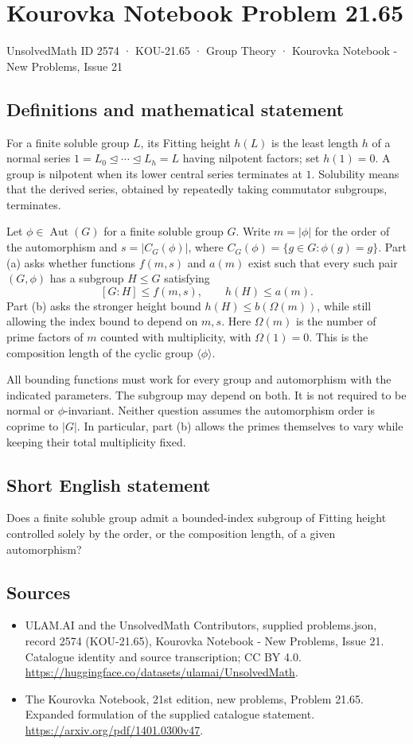 \documentclass[11pt,a4paper]{article}
\begin{document}
\section*{Kourovka Notebook Problem 21.65}\label{2574}
{\small UnsolvedMath ID 2574 · KOU-21.65 · Group Theory · Kourovka Notebook - New Problems, Issue 21}
\subsection{Definitions and mathematical statement}
For a finite soluble group $L$, its Fitting height $h(L)$ is the
least length $h$ of a normal series
$1=L_0\trianglelefteq\cdots\trianglelefteq L_h=L$ having nilpotent
factors; set $h(1)=0$. A group is nilpotent when its lower central
series terminates at $1$. Solubility means that the derived series,
obtained by repeatedly taking commutator subgroups, terminates.

Let $\phi\in\operatorname{Aut}(G)$ for a finite soluble group $G$.
Write $m=|\phi|$ for the order of the automorphism and
$s=|C_G(\phi)|$, where
$C_G(\phi)=\{g\in G:\phi(g)=g\}$.
Part (a) asks whether functions $f(m,s)$ and $a(m)$ exist such that
every such pair $(G,\phi)$ has a subgroup $H\le G$ satisfying
\[
 [G:H]\le f(m,s),\qquad h(H)\le a(m).
\]
Part (b) asks the stronger height bound $h(H)\le b(\Omega(m))$,
while still allowing the index bound to depend on $m,s$.
Here $\Omega(m)$ is the number of prime factors of $m$ counted with
multiplicity, with $\Omega(1)=0$. This is the composition length of
the cyclic group $\langle\phi\rangle$.

All bounding functions must work for every group and automorphism
with the indicated parameters. The subgroup may depend on both.
It is not required to be normal or $\phi$-invariant. Neither question
assumes the automorphism order is coprime to $|G|$. In particular,
part (b) allows the primes themselves to vary while keeping their
total multiplicity fixed.
\subsection{Short English statement}
Does a finite soluble group admit a bounded-index subgroup of Fitting height controlled solely by the order, or the composition length, of a given automorphism?
\subsection{Sources}
\begin{itemize}
\item[S1] ULAM.AI and the UnsolvedMath Contributors, supplied problems.json, record 2574 (KOU-21.65), Kourovka Notebook - New Problems, Issue 21. Catalogue identity and source transcription; CC BY 4.0.
\url{https://huggingface.co/datasets/ulamai/UnsolvedMath}.
\item[S2] The Kourovka Notebook, 21st edition, new problems, Problem 21.65. Expanded formulation of the supplied catalogue statement.
\url{https://arxiv.org/pdf/1401.0300v47}.
\end{itemize}
\end{document}
